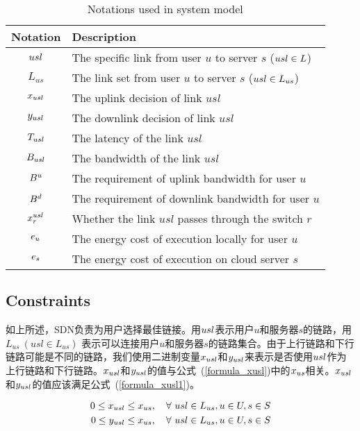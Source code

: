 \begin{table}[!h]
  \caption{Notations used in system model}
  \vspace{-1em}
  \label{table_notations_ispa}
  \centering
  \begin{tabular}{c|p{6cm}}
  \hline
  \textbf{Notation} & \textbf{Description}\\
  \hline
  $usl$ & The specific link from user $u$ to server $s$ ($usl \in L$)\\\hline
  $L_{us}$ & The link set from user $u$ to server $s$ ($usl \in L_{us}$)\\\hline
  $x_{usl}$ & The uplink decision of link $usl$\\\hline
  $y_{usl}$ & The downlink decision of link $usl$\\\hline
  $T_{usl}$ & The latency of the link $usl$\\\hline
  $B_{usl}$ & The bandwidth of the link $usl$\\\hline
  $B^{u}$ & The requirement of uplink bandwidth for user $u$\\\hline
  $B^{d}$ & The requirement of downlink bandwidth for user $u$\\\hline
  $x^{usl}_{r}$ & Whether the link $usl$ passes through the switch $r$\\\hline
  $e_u$ & The energy cost of execution locally for user $u$\\\hline
  $e_s$ & The energy cost of execution on cloud server $s$\\\hline
  \end{tabular}
\end{table}

\subsection{Constraints}

如上所述，SDN负责为用户选择最佳链接。用$usl$表示用户$u$和服务器$s$的链路，用$L_{us}\ (usl \in L_{us})$ 表示可以连接用户$u$和服务器$s$的链路集合。由于上行链路和下行链路可能是不同的链路，我们使用二进制变量$x_{usl}$和$y_{usl}$来表示是否使用$usl$作为上行链路和下行链路。$x_{usl}$和$y_{usl}$的值与公式~(\ref{formula_xusl})中的${x}_{us}$相关。$x_{usl}$和$y_{usl}$的值应该满足公式~(\ref{formula_xusl1})。

\begin{equation}
\label{formula_xusl}
\begin{aligned}
0 \leq x_{usl} \leq {x}_{us}, \quad \forall \ usl\in L_{us}, u\in U, s\in S\\
0 \leq y_{usl} \leq {x}_{us}, \quad \forall \ usl\in L_{us}, u\in U, s\in S\\
\end{aligned}
\end{equation}

